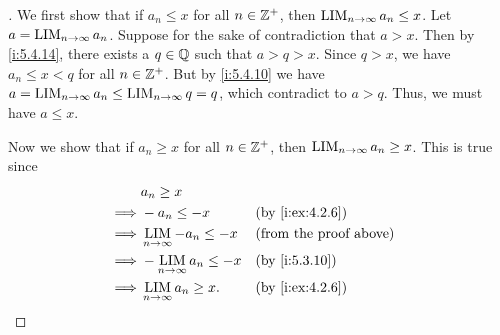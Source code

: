\begin{proof}[]
  We first show that if \(a_n \leq x\) for all \(n \in \mathbb{Z}^+\), then \(\operatorname*{LIM}_{n \to \infty} a_n \leq x\).
  Let \(a = \operatorname*{LIM}_{n \to \infty} a_n\).
  Suppose for the sake of contradiction that \(a > x\).
  Then by \cref{i:5.4.14}, there exists a \(q \in \mathbb{Q}\) such that \(a > q > x\).
  Since \(q > x\), we have \(a_n \leq x < q\) for all \(n \in \mathbb{Z}^+\).
  But by \cref{i:5.4.10} we have \(a = \operatorname*{LIM}_{n \to \infty} a_n \leq \operatorname*{LIM}_{n \to \infty} q = q\), which contradict to \(a > q\).
  Thus, we must have \(a \leq x\).

  Now we show that if \(a_n \geq x\) for all \(n \in \mathbb{Z}^+\), then \(\operatorname*{LIM}_{n \to \infty} a_n \geq x\).
  This is true since
  \begin{align*}
             & a_n \geq x                                                          \\
    \implies & -a_n \leq -x                     &  & \by{i:ex:4.2.6}               \\
    \implies & \LIM_{n \to \infty} -a_n \leq -x &  & \text{(from the proof above)} \\
    \implies & -\LIM_{n \to \infty} a_n \leq -x &  & \by{i:5.3.10}                 \\
    \implies & \LIM_{n \to \infty} a_n \geq x.  &  & \by{i:ex:4.2.6}
  \end{align*}
\end{proof}

